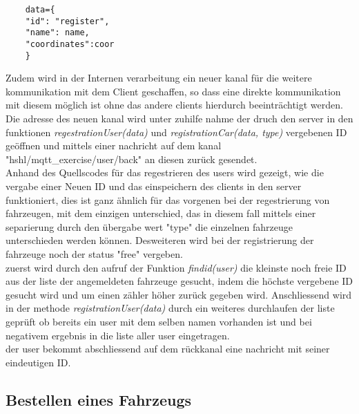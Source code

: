 \documentclass[conference]{IEEEtran}
\begin{document}
\begin{lstlisting}
    data={
    "id": "register",
    "name": name,
    "coordinates":coor
    }	
\end{lstlisting}
Zudem wird in der Internen verarbeitung ein neuer kanal für die weitere kommunikation mit dem Client geschaffen, so dass eine direkte kommunikation mit diesem möglich ist ohne das andere clients hierdurch beeinträchtigt werden. Die adresse des neuen kanal wird unter zuhilfe nahme der druch den server in den funktionen \textit{regestrationUser(data)} und \textit{registrationCar(data, type)} vergebenen ID geöffnen und mittels einer nachricht auf dem kanal \textsf{"hshl/mqtt\_exercise/user/back"} an diesen zurück gesendet. \\
Anhand des Quellscodes für das regestrieren des users wird gezeigt, wie die vergabe einer Neuen ID und das einspeichern des clients in den server funktioniert, dies ist ganz ähnlich für das vorgenen bei der regestrierung von fahrzeugen, mit dem einzigen unterschied, das in diesem fall mittels einer separierung durch den übergabe wert "type" die einzelnen fahrzeuge unterschieden werden können. Desweiteren wird bei der registrierung der fahrzeuge noch der status "free" vergeben.\\
zuerst wird durch den aufruf der Funktion \textit{findid(user)} die kleinste noch freie ID aus der liste der angemeldeten fahrzeuge gesucht, indem die höchste vergebene ID gesucht wird und um einen zähler höher zurück gegeben wird. Anschliessend wird in der methode \textit{registrationUser(data)} durch ein weiteres durchlaufen der liste geprüft ob bereits ein user mit dem selben namen vorhanden ist und bei negativem ergebnis in  die liste aller user eingetragen.\\ der user bekommt abschliessend auf dem rückkanal eine nachricht mit seiner eindeutigen ID. 
\subsection{Bestellen eines Fahrzeugs}

\begin{thebibliography}{00}
\end{thebibliography}
\vspace{12pt}
\end{document}
